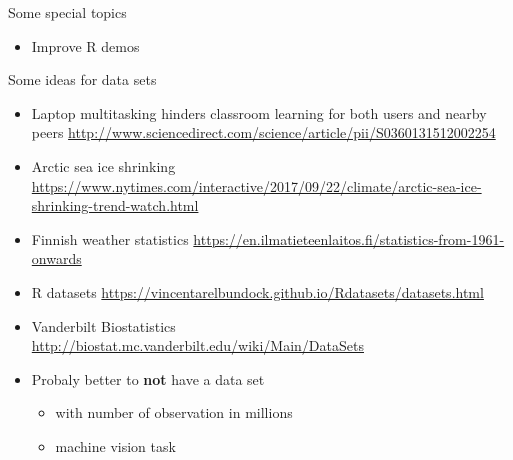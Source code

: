 \documentclass[t]{beamer}
\begin{document}
\begin{frame}
  
  {\Large\color{navyblue} Some special topics}

  \begin{itemize}
  \item Improve R demos
  \end{itemize}
  
\end{frame}

\begin{frame}
  
  {\Large\color{navyblue} Some ideas for data sets}
  
  \begin{itemize}
  \item Laptop multitasking hinders classroom learning for both users
    and nearby peers
    \url{http://www.sciencedirect.com/science/article/pii/S0360131512002254}
  \item Arctic sea ice shrinking \url{https://www.nytimes.com/interactive/2017/09/22/climate/arctic-sea-ice-shrinking-trend-watch.html}
  \item Finnish weather statistics \url{https://en.ilmatieteenlaitos.fi/statistics-from-1961-onwards}
  \item R datasets \url{https://vincentarelbundock.github.io/Rdatasets/datasets.html}
  \item Vanderbilt Biostatistics \url{http://biostat.mc.vanderbilt.edu/wiki/Main/DataSets}
  \item Probaly better to \textbf{not} have a data set
    \begin{itemize}
    \item with number of observation in millions
    \item machine vision task
    \end{itemize}
  \end{itemize}
\end{frame}
\end{document}
